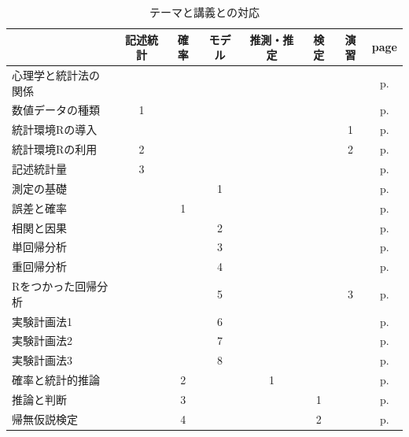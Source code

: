 \begin{table}
	\centering
	\caption{テーマと講義との対応}
	\label{processTable}
	\begin{tabular}[t]{lccccccc}
		             & 記述統計 & 確率 & モデル & 推測・推定 & 検定 & 演習 & page                                 \\\hline\hline
		心理学と統計法の関係   &      &    &     &       &    &    & p.\pageref{m01_introduction}         \\
		数値データの種類     & 1    &    &     &       &    &    & p.\pageref{m02_Numbers}              \\
		統計環境Rの導入     &      &    &     &       &    & 1  & p.\pageref{m03_introR}               \\
		統計環境Rの利用     & 2    &    &     &       &    & 2  & p.\pageref{m04_usingR}               \\
		記述統計量        & 3    &    &     &       &    &    & p.\pageref{m05_descriptives}         \\
		測定の基礎        &      &    & 1   &       &    &    & p.\pageref{m06_ctt}                  \\
		誤差と確率        &      & 1  &     &       &    &    & p.\pageref{m07_probability}          \\
		相関と因果        &      &    & 2   &       &    &    & p.\pageref{m08_CorrelationCausation} \\
		単回帰分析        &      &    & 3   &       &    &    & p.\pageref{m09_Regression}           \\
		重回帰分析        &      &    & 4   &       &    &    & p.\pageref{m10_MultipleRegression}   \\
		Rをつかった回帰分析   &      &    & 5   &       &    & 3  & p.\pageref{m11_MRonR}                \\
		実験計画法1       &      &    & 6   &       &    &    & p.\pageref{m12_design1}              \\
		実験計画法2       &      &    & 7   &       &    &    & p.\pageref{m13_design2}              \\
		実験計画法3       &      &    & 8   &       &    &    & p.\pageref{m14_design3}              \\\hline
		確率と統計的推論     &      & 2  &     & 1     &    &    & p.\pageref{m16_inference}            \\
		推論と判断        &      & 3  &     &       & 1  &    & p.\pageref{m17_estimation_and_test}  \\
		帰無仮説検定       &      & 4  &     &       & 2  &    & p.\pageref{m18_NHST}                 \\

\end{tabular}
\end{table}

